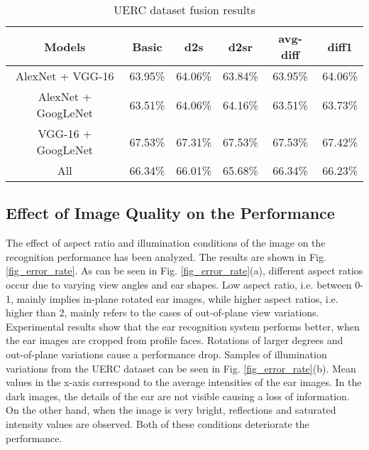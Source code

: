 \documentclass[11pt,journal,compsoc]{IEEEtran}
\begin{document}
\begin{table*}[!h]
\renewcommand{\arraystretch}{1.3}
\caption{UERC dataset fusion results}
\label{UERC_Fusion}
\centering
\begin{tabular}{|c|c|c|c|c|c|}
\hline
Models  & Basic & d2s & d2sr & avg-diff & diff1\\
\hline
AlexNet + VGG-16 & 63.95\% & 64.06\% & 63.84\% & 63.95\% & 64.06\% \\
\hline
AlexNet + GoogLeNet & 63.51\% & 64.06\% & 64.16\% & 63.51\% & 63.73\% \\
\hline
VGG-16 + GoogLeNet & 67.53\% & 67.31\% & 67.53\% & 67.53\% & 67.42\% \\
\hline
All & 66.34\% & 66.01\% & 65.68\% & 66.34\% & 66.23\% \\
\hline
\end{tabular}
\end{table*}

\subsection{Effect of Image Quality on the Performance}
The effect of aspect ratio and illumination conditions of the image on the recognition performance has been analyzed. The results are shown in Fig. \ref{fig_error_rate}. As can be seen in Fig. \ref{fig_error_rate}(a), different aspect ratios occur due to varying view angles and ear shapes. Low aspect ratio, i.e. between 0-1, mainly implies in-plane rotated ear images, while higher aspect ratios, i.e. higher than 2, mainly refers to the cases of out-of-plane view variations. Experimental results show that the ear recognition system performs better, when the ear images are cropped from profile faces. Rotations of larger degrees and out-of-plane variations cause a performance drop. Samples of illumination variations from the UERC dataset can be seen in Fig. \ref{fig_error_rate}(b). Mean values in the x-axis correspond to the average intensities of the ear images. In the dark images, the details of the ear are not visible causing a loss of information. On the other hand, when the image is very bright, reflections and saturated intensity values are observed. Both of these conditions deteriorate the performance. 
\end{document}
